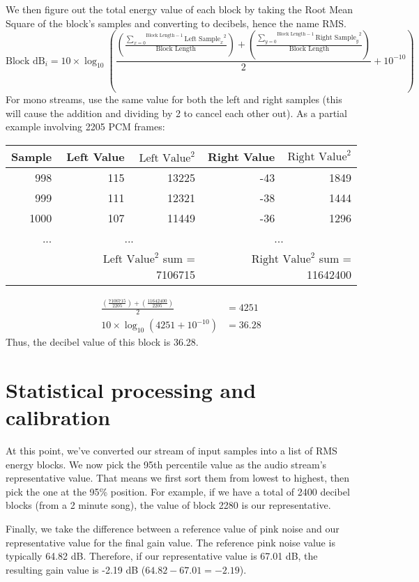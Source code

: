 We then figure out the total energy value of each block by taking
the Root Mean Square of the block's samples and converting to decibels,
hence the name RMS.
{
\begin{equation}
\text{Block dB}_i = 10 \times \log_{10} \left (
\frac{\left ( \frac{\overset{\text{Block Length} - 1}{\underset{x = 0}{\sum}} {\text{Left Sample}_x} ^ 2}{\text{Block Length}} \right ) + \left ( \frac{\overset{\text{Block Length} - 1}{\underset{y = 0}{\sum}} {\text{Right Sample}_y} ^ 2}{\text{Block Length}} \right ) }{2} + 10 ^ {-10} \right )
\end{equation}
}
For mono streams, use the same value for both the left and right samples
(this will cause the addition and dividing by 2 to cancel each other out).
As a partial example involving 2205 PCM frames:
\begin{table}[h]
\begin{tabular}{|r|r|r|r|r|}
\hline
Sample & Left Value & $\text{Left Value} ^ 2$ & Right Value & $\text{Right Value} ^ 2$ \\
\hline
998 & 115 & 13225 & -43 & 1849 \\
999 & 111 & 12321 & -38 & 1444 \\
1000 & 107 & 11449 & -36 & 1296 \\
... & \multicolumn{2}{c|}{...} & \multicolumn{2}{c|}{...} \\
\hline
& \multicolumn{2}{r|}{$\text{Left Value} ^ 2$ sum = 7106715} &
\multicolumn{2}{r|}{$\text{Right Value} ^ 2$ sum = 11642400} \\
\hline
\end{tabular}
\end{table}
\begin{align}
\frac{(\frac{7106715}{2205}) + (\frac{11642400}{2205})}{2} &= 4251 \\
10 \times \log_{10}(4251 + 10 ^ {-10} ) &= 36.28
\end{align}
Thus, the decibel value of this block is 36.28.

\section{Statistical processing and calibration}
At this point, we've converted our stream of input samples into a
list of RMS energy blocks.
We now pick the 95th percentile value as the audio stream's representative
value.
That means we first sort them from lowest to highest, then pick the one at the
95\% position.
For example, if we have a total of 2400 decibel blocks (from a 2 minute song),
the value of block 2280 is our representative.

Finally, we take the difference between a reference value of pink noise
and our representative value for the final gain value.
The reference pink noise value is typically 64.82 dB.
Therefore, if our representative value is 67.01 dB, the resulting
gain value is -2.19 dB ($64.82 - 67.01 = -2.19$).

